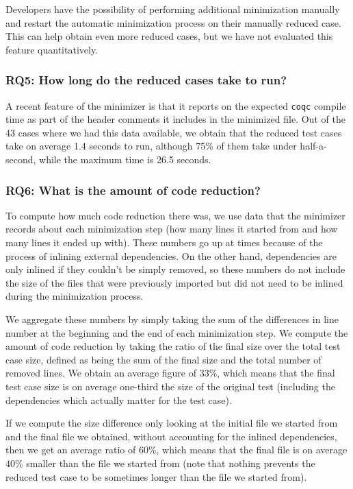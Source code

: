 \documentclass[a4paper,USenglish,cleveref,autoref,thm-restate]{lipics-v2021}
\begin{document}
Developers have the possibility of performing additional minimization manually and restart the automatic minimization process on their manually reduced case. This can help obtain even more reduced cases, but we have not evaluated this feature quantitatively.

\subsubsection{RQ5: How long do the reduced cases take to run?}

A recent feature of the minimizer is that it reports on the expected \texttt{coqc} compile time as part of the header comments it includes in the minimized file. Out of the 43 cases where we had this data available, we obtain that the reduced test cases take on average 1.4 seconds to run, although 75\% of them take under half-a-second, while the maximum time is 26.5 seconds.

\subsubsection{RQ6: What is the amount of code reduction?}

To compute how much code reduction there was, we use data that the minimizer records about each minimization step (how many lines it started from and how many lines it ended up with). These numbers go up at times because of the process of inlining external dependencies. On the other hand, dependencies are only inlined if they couldn't be simply removed, so these numbers do not include the size of the files that were previously imported but did not need to be inlined during the minimization process.

We aggregate these numbers by simply taking the sum of the differences in line number at the beginning and the end of each minimization step. We compute the amount of code reduction by taking the ratio of the final size over the total test case size, defined as being the sum of the final size and the total number of removed lines. We obtain an average figure of 33\%, which means that the final test case size is on average one-third the size of the original test (including the dependencies which actually matter for the test case).

If we compute the size difference only looking at the initial file we started from and the final file we obtained, without accounting for the inlined dependencies, then we get an average ratio of 60\%, which means that the final file is on average 40\% smaller than the file we started from (note that nothing prevents the reduced test case to be sometimes longer than the file we started from).
\end{document}
